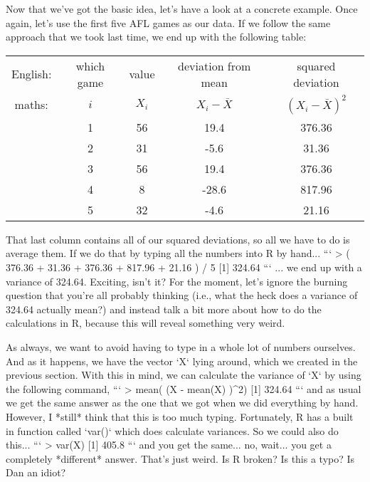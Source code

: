 Now that we've got the basic idea, let's have a look at a concrete example. Once again, let's use the first five AFL games as our data. If we follow the same approach that we took last time, we end up with the following table:
\begin{center}
\begin{tabular}{ccccc} 
English: & which game & value & deviation from mean & squared deviation \\
maths: & $i$ & $X_i$ & $X_i - \bar{X}$ &  $(X_i - \bar{X})^2$ \\ \hline
& 1 & 56 & 19.4  & 376.36\\
& 2 & 31 &  -5.6 & 31.36\\ 
& 3 & 56 & 19.4  & 376.36\\
& 4 & 8 & -28.6  & 817.96\\
& 5 & 32 & -4.6  & 21.16 \\
\end{tabular}
\end{center}
That last column contains all of our squared deviations, so all we have to do is average them. If we do that by typing all the numbers into R by hand...
```
> ( 376.36 + 31.36 + 376.36 + 817.96 + 21.16 ) / 5
[1] 324.64
```
... we end up with a variance of 324.64. Exciting, isn't it? For the moment, let's ignore the burning question that you're all probably thinking (i.e., what the heck does a variance of 324.64 actually mean?) and instead talk a bit more about how to do the calculations in R, because this will reveal something very weird.

As always, we want to avoid having to type in a whole lot of numbers ourselves. And as it happens, we have the vector `X` lying around, which we created in the previous section. With this in mind, we can calculate the variance of `X` by using the following command,
```
> mean( (X - mean(X) )^2)
[1] 324.64
```
and as usual we get the same answer as the one that we got when we did everything by hand. However, I *still* think that this is too much typing. Fortunately, R has a built in function called `var()` which does calculate variances. So we could also do this...
```
> var(X)
[1] 405.8
```
and you get the same... no, wait... you get a completely *different* answer. That's just weird. Is R broken? Is this a typo? Is Dan an idiot? 

